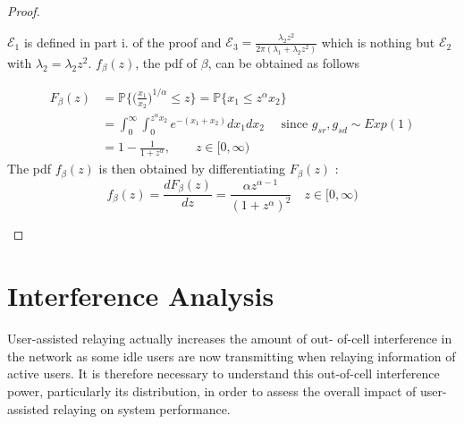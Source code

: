 \documentclass[titlepage]{article}
\begin{document}
\begin{proof}
\begin{itemize}
$\mathcal{E}_1$ is defined in part i. of the proof and  $\mathcal{E}_3 = \frac{\lambda_2 z^2}{2\pi(\lambda_1+\lambda_2z^2)}$ which is nothing but $\mathcal{E}_2$ with $\lambda_2 = \lambda_2z^2$. $f_\beta(z)$, the pdf of $\beta$, can be obtained as follows

\begin{align*}
F_\beta(z) &= \mathbb{P}\bigg\{ \bigg( \frac{x_1}{x_2}\bigg)^{1/\alpha} \leq z \bigg\} = \mathbb{P} \{ x_1\leq z^\alpha x_2\} \\
&= \int_0^\infty \int_0^{z^\alpha x_2} e^{-(x_1+x_2)} dx_1dx_2 \quad \text{ since } g_{sr},g_{sd} \sim Exp(1) \\
&= 1-\frac{1}{1+z^\alpha}, \qquad z \in [0,\infty)
\end{align*}
The pdf $f_\beta(z)$ is then obtained by differentiating $F_\beta(z)$ :
\begin{equation*}
    f_\beta(z) = \frac{dF_\beta(z)}{dz} = \frac{\alpha z^{\alpha-1}}{(1+z^\alpha)^2} \quad z \in [0,\infty)
\end{equation*}
\end{itemize}
\end{proof}
\section{Interference Analysis} \label{sec:interference}
User-assisted relaying actually increases the amount of out-
of-cell interference in the network as some idle users are now
transmitting when relaying information of active users. It is
therefore necessary to understand this out-of-cell interference
power, particularly its distribution, in order to assess the overall
impact of user-assisted relaying on system performance.
\end{document}
